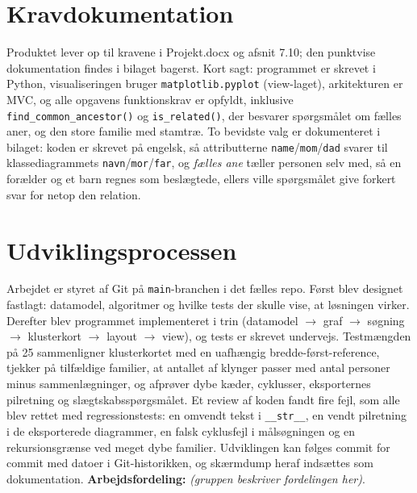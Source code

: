 \documentclass[12pt, a4paper]{article}
\begin{document}
\section{Kravdokumentation}

Produktet lever op til kravene i Projekt.docx og afsnit 7.10; den punktvise
dokumentation findes i bilaget bagerst. Kort sagt: programmet er skrevet i Python,
visualiseringen bruger \texttt{matplotlib.pyplot} (view-laget), arkitekturen
er MVC, og alle opgavens funktionskrav er opfyldt, inklusive
\texttt{find\_common\_ancestor()} og \texttt{is\_related()}, der besvarer
spørgsmålet om fælles aner, og den store familie med stamtræ. To bevidste valg
er dokumenteret i bilaget: koden er skrevet på engelsk, så attributterne
\texttt{name}/\texttt{mom}/\texttt{dad} svarer til klassediagrammets
\texttt{navn}/\texttt{mor}/\texttt{far}, og \emph{fælles ane} tæller personen
selv med, så en forælder og et barn regnes som beslægtede, ellers ville
spørgsmålet give forkert svar for netop den relation.

\section{Udviklingsprocessen}

Arbejdet er styret af Git på \texttt{main}-branchen i det fælles repo. Først
blev designet fastlagt: datamodel, algoritmer og hvilke tests der skulle vise,
at løsningen virker. Derefter blev programmet implementeret i trin (datamodel
$\to$ graf $\to$ søgning $\to$ klusterkort $\to$ layout $\to$ view), og tests er
skrevet undervejs. Testmængden på 25 sammenligner klusterkortet med en
uafhængig bredde-først-reference, tjekker på tilfældige familier, at antallet af
klynger passer med antal personer minus sammenlægninger, og afprøver dybe
kæder, cyklusser, eksporternes pilretning og slægtskabsspørgsmålet. Et review af
koden fandt fire fejl, som alle blev rettet med regressionstests: en omvendt
tekst i \texttt{\_\_str\_\_}, en vendt pilretning i de eksporterede diagrammer,
en falsk cyklusfejl i målsøgningen og en rekursionsgrænse ved meget dybe
familier. Udviklingen kan følges commit for commit med datoer i Git-historikken,
og skærmdump heraf indsættes som dokumentation.
\textbf{Arbejdsfordeling:} \textit{(gruppen beskriver fordelingen her)}.
\end{document}
